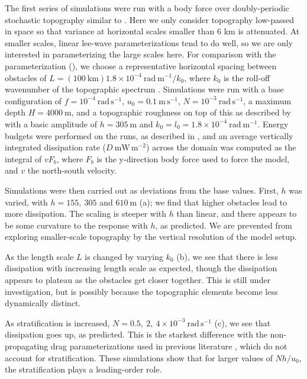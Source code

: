 \documentclass[twocol]{ametsocV5}
\begin{document}
The first series of simulations were run with a body force over doubly-periodic stochastic topography similar to \citet{klymak18}. Here we only consider topography low-passed in space so that variance at horizontal scales smaller than 6 km is attenuated.  At smaller scales, linear lee-wave parameterizations tend to do well, so we are only interested in parameterizing the large scales here.  For comparison with the parameterization (), we choose a representative horizontal spacing between obstacles of $L = \left(100 \ \mathrm{km}\right) 1.8 \times 10^{-4}\ \mathrm{rad\ m^{-1}} / k_0$, where $k_0$ is the roll-off wavenumber of the topographic spectrum \citep{klymak18}.  Simulations were run with a base configuration of $f=10^{-4}\ \mathrm{rad\, s^{-1}}$, $u_0=0.1\ \mathrm{m\,s^{-1}}$, $N=10^{-3}\ \mathrm{rad\, s^{-1}}$, a maximum depth $H=4000\ \mathrm{m}$, and a topographic roughness on top of this as described by  with a basic amplitude of $h = 305\ \mathrm{m}$ and $k_0 = l_0 = 1.8\times10^{-4}\ \mathrm{rad\ m^{-1}}$. Energy budgets were performed on the runs, as described in \citep{klymak18}, and an average vertically integrated dissipation rate ($D \ \mathrm{mW\,m^{-2}}$) across the domain was computed as the integral of $v F_b$, where $F_b$ is the y-direction body force used to force the model, and $v$ the north-south velocity.

Simulations were then carried out as deviations from the base values.  First, $h$ was varied, with $h = 155,\ 305$ and $610\ \mathrm{m}$ (a); we find that higher obstacles lead to more dissipation.  The scaling is steeper with $h$ than linear, and there appears to be some curvature to the response with $h$, as predicted.  We are prevented from exploring smaller-scale topography by the vertical resolution of the model setup.

As the length scale $L$ is changed by varying  $k_0$ (b), we see that there is less dissipation with increasing length scale as expected, though the dissipation appears to plateau as the obstacles get closer together.  This is still under investigation, but is possibly because the topographic elements become less dynamically distinct.

As stratification is increased, $N = 0.5,\ 2,\ 4\times 10^{-3}\ \mathrm{rad\, s^{-1}}$ (c), we see that dissipation goes up, as predicted.  This is the starkest difference with the non-propagating drag parameterizations used in previous literature \citep[i.e.][]{trossmanetal13}, which do not account for stratification.  These simulations show that for  larger values of $Nh/u_0$, the stratification plays a leading-order role.
\end{document}
